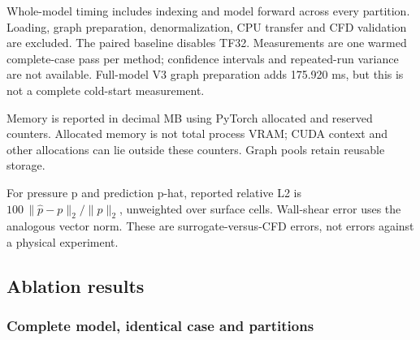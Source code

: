 \documentclass[
  10pt,
]{article}
\begin{document}
Whole-model timing includes indexing and model forward across every
partition. Loading, graph preparation, denormalization, CPU transfer and
CFD validation are excluded. The paired baseline disables TF32.
Measurements are one warmed complete-case pass per method; confidence
intervals and repeated-run variance are not available. Full-model V3
graph preparation adds 175.920 ms, but this is not a complete cold-start
measurement.

Memory is reported in decimal MB using PyTorch allocated and reserved
counters. Allocated memory is not total process VRAM; CUDA context and
other allocations can lie outside these counters. Graph pools retain
reusable storage.

For pressure p and prediction p-hat, reported relative L2 is
\(100\,\|\hat p-p\|_2/\|p\|_2\), unweighted over surface cells.
Wall-shear error uses the analogous vector norm. These are
surrogate-versus-CFD errors, not errors against a physical experiment.

\subsection{Ablation results}\label{ablation-results}

\subsubsection{Complete model, identical case and
partitions}\label{complete-model-identical-case-and-partitions}
\end{document}
